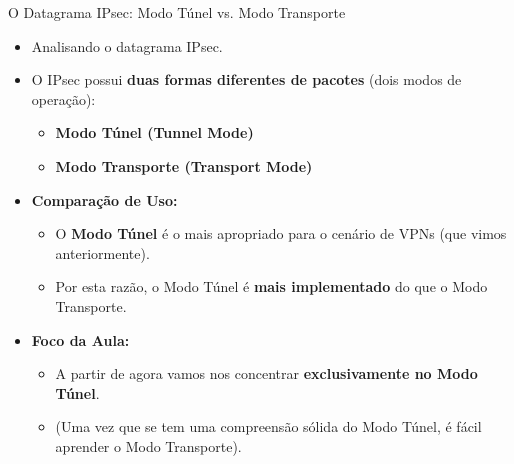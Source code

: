 \begin{frame}{O Datagrama IPsec: Modo Túnel vs. Modo Transporte}
    \begin{itemize}
        \item Analisando o datagrama IPsec.

        \item O IPsec possui \textbf{duas formas diferentes de pacotes} (dois modos de operação):
              \begin{itemize}
                  \item \textbf{Modo Túnel (Tunnel Mode)}
                  \item \textbf{Modo Transporte (Transport Mode)}
              \end{itemize}

        \item \textbf{Comparação de Uso:}
              \begin{itemize}
                  \item O \textbf{Modo Túnel} é o mais apropriado para o cenário de VPNs (que vimos anteriormente).
                  \item Por esta razão, o Modo Túnel é \textbf{mais implementado} do que o Modo Transporte.
              \end{itemize}

        \item \textbf{Foco da Aula:}
              \begin{itemize}
                  \item A partir de agora vamos nos concentrar \textbf{exclusivamente no Modo Túnel}.
                  \item (Uma vez que se tem uma compreensão sólida do Modo Túnel, é fácil aprender o Modo Transporte).
              \end{itemize}
    \end{itemize}
\end{frame}
